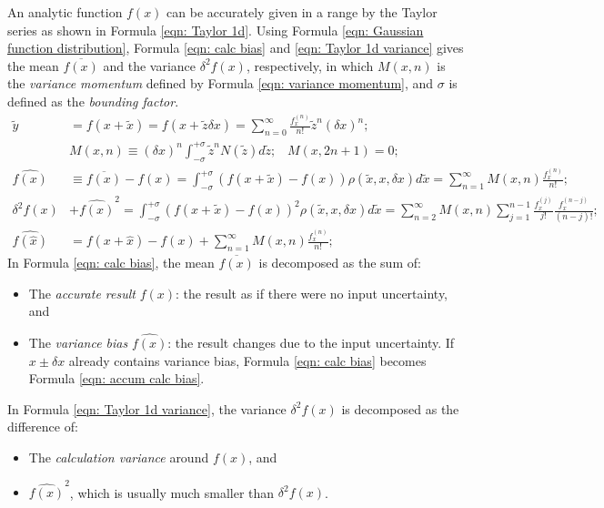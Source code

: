 \documentclass[twoside]{article}
\numberwithin{equation}{section}
\newcommand{\eqspace}{\;\;\;}
\begin{document}
An analytic function $f(x)$ can be accurately given in a range by the Taylor series as shown in Formula \eqref{eqn: Taylor 1d}.
Using Formula \eqref{eqn: Gaussian function distribution}, Formula \eqref{eqn: calc bias} and \eqref{eqn: Taylor 1d variance} gives the mean $\overline{f(x)}$ and the variance $\delta^2 f(x)$, respectively, in which $M(x, n)$ is the \emph{variance momentum} defined by Formula \eqref{eqn: variance momentum}, and $\sigma$ is defined as the \emph{bounding factor}.
\begin{align}
\label{eqn: Taylor 1d} 
\tilde{y} &= f(x + \tilde{x}) = f(x + \tilde{z} \delta x) = \sum_{n=0}^{\infty} \frac{f^{(n)}_x}{n!} \tilde{z}^n (\delta x)^n; \\
\label{eqn: variance momentum}
& M(x, n) \equiv (\delta x)^n \int_{-\sigma}^{+\sigma} \tilde{z}^n N(\tilde{z}) d \tilde{z};\eqspace M(x, 2n+1) = 0; \\
\label{eqn: calc bias}
\widehat{f(x)} &\equiv \overline{f(x)} - f(x) =  \int_{-\sigma}^{+\sigma} (f(x + \tilde{x}) - f(x)) \rho(\tilde{x}, x, \delta x) d \tilde{x}
 = \sum_{n=1}^{\infty} M(x, n) \frac{f^{(n)}_x}{n!}; \\
\label{eqn: Taylor 1d variance}
\delta^2 f(x) & + \widehat{f(x)}^2 = \int_{-\sigma}^{+\sigma} (f(x + \tilde{x}) - f(x))^2 \rho(\tilde{x}, x, \delta x) d \tilde{x} 
= \sum_{n=2}^{\infty} M(x, n) \sum_{j=1}^{n-1} \frac{f^{(j)}_x}{j!} \frac{f^{(n-j)}_x}{(n-j)!}; \\
\label{eqn: accum calc bias}
\widehat{f(\widehat{x})} &= f(x + \widehat{x}) - f(x) + \sum_{n=1}^{\infty} M(x, n) \frac{f^{(n)}_x}{n!};
\end{align}
In Formula \eqref{eqn: calc bias}, the mean $\overline{f(x)}$ is decomposed as the sum of:
\begin{itemize}
\item The \emph{accurate result} $f(x)$: the result as if there were no input uncertainty, and 

\item The \emph{variance bias} $\widehat{f(x)}$: the result changes due to the input uncertainty.
If $x \pm \delta x$ already contains variance bias, Formula \eqref{eqn: calc bias} becomes  Formula \eqref{eqn: accum calc bias}.

\end{itemize} 
In Formula \eqref{eqn: Taylor 1d variance}, the variance $\delta^2 f(x)$ is decomposed as the difference of:
\begin{itemize}

\item The \emph{calculation variance} around $f(x)$, and

\item $\widehat{f(x)}^2$, which is usually much smaller than $\delta^2 f(x)$.

\end{itemize} 
\end{document}
